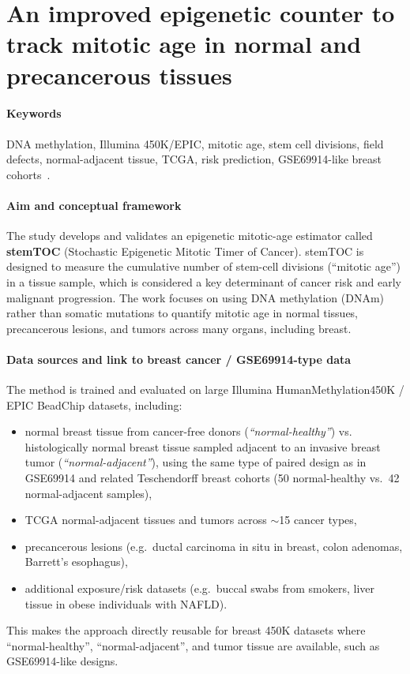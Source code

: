 \documentclass[10pt]{extarticle}
\begin{document}
\section{An improved epigenetic counter to track mitotic age in normal and precancerous tissues}

\paragraph{Keywords}
DNA methylation, Illumina 450K/EPIC, mitotic age, stem cell divisions, field defects, normal-adjacent tissue, TCGA, risk prediction, GSE69914-like breast cohorts~\cite{zhu2024stemtoc}.

\paragraph{Aim and conceptual framework}
The study develops and validates an epigenetic mitotic-age estimator called \textbf{stemTOC} (Stochastic Epigenetic Mitotic Timer of Cancer). stemTOC is designed to measure the cumulative number of stem-cell divisions (``mitotic age'') in a tissue sample, which is considered a key determinant of cancer risk and early malignant progression. The work focuses on using DNA methylation (DNAm) rather than somatic mutations to quantify mitotic age in normal tissues, precancerous lesions, and tumors across many organs, including breast.

\paragraph{Data sources and link to breast cancer / GSE69914-type data}
The method is trained and evaluated on large Illumina HumanMethylation450K / EPIC BeadChip datasets, including:
\begin{itemize}[label=-]
  \item normal breast tissue from cancer-free donors (\textit{``normal-healthy''}) vs. histologically normal breast tissue sampled adjacent to an invasive breast tumor (\textit{``normal-adjacent''}), using the same type of paired design as in GSE69914 and related Teschendorff breast cohorts (50 normal-healthy vs.\ 42 normal-adjacent samples),
  \item TCGA normal-adjacent tissues and tumors across $\sim$15 cancer types,
  \item precancerous lesions (e.g.\ ductal carcinoma in situ in breast, colon adenomas, Barrett's esophagus),
  \item additional exposure/risk datasets (e.g.\ buccal swabs from smokers, liver tissue in obese individuals with NAFLD).
\end{itemize}
This makes the approach directly reusable for breast 450K datasets where ``normal-healthy'', ``normal-adjacent'', and tumor tissue are available, such as GSE69914-like designs.
\end{document}
